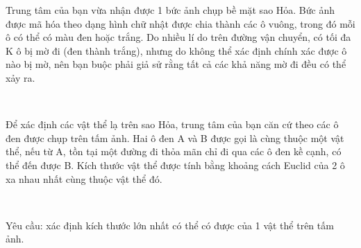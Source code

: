 Trung tâm của bạn vừa nhận được 1 bức ảnh chụp bề mặt sao Hỏa. Bức ảnh được mã hóa theo dạng hình chữ nhật được chia thành các ô vuông, trong đó mỗi ô có thể có màu đen hoặc trắng. Do nhiều lí do trên đường vận chuyển, có tối đa K ô bị mờ đi (đen thành trắng), nhưng do không thể xác định chính xác được ô nào bị mờ, nên bạn buộc phải giả sử rằng tất cả các khả năng mờ đi đều có thể xảy ra.

 

Để xác định các vật thể lạ trên sao Hỏa, trung tâm của bạn căn cứ theo các ô đen được chụp trên tấm ảnh. Hai ô đen A và B được gọi là cùng thuộc một vật thể, nếu từ A, tồn tại một đường đi thỏa mãn chỉ đi qua các ô đen kề cạnh, có thể đến được B. Kích thước vật thể được tính bằng khoảng cách Euclid của 2 ô xa nhau nhất cùng thuộc vật thể đó.

 

Yêu cầu: xác định kích thước lớn nhất có thể có được của 1 vật thể trên tấm ảnh.